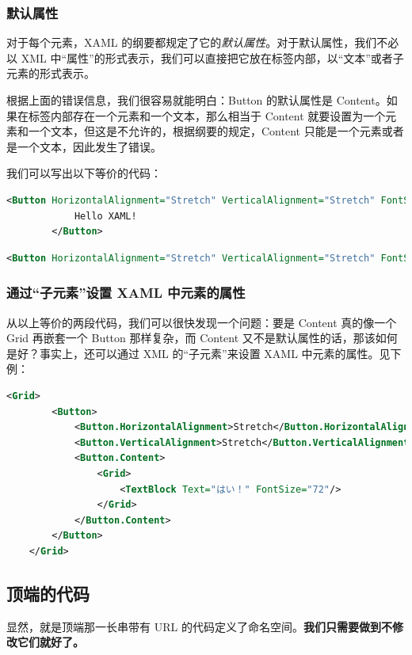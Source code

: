 \subsubsection{默认属性}

对于每个元素，XAML 的纲要都规定了它的\emph{默认属性}。对于默认属性，我们不必以 XML 中``属性''的形式表示，我们可以直接把它放在标签内部，以``文本''或者子元素的形式表示。

根据上面的错误信息，我们很容易就能明白：Button 的默认属性是 Content。如果在标签内部存在一个元素和一个文本，那么相当于 Content 就要设置为一个元素和一个文本，但这是不允许的，根据纲要的规定，Content 只能是一个元素或者是一个文本，因此发生了错误。

我们可以写出以下等价的代码：
\begin{lstlisting}[language = xml]
        <Button HorizontalAlignment="Stretch" VerticalAlignment="Stretch" FontSize="72">
            Hello XAML!
        </Button>
\end{lstlisting}
\begin{lstlisting}[language = xml]
        <Button HorizontalAlignment="Stretch" VerticalAlignment="Stretch" FontSize="72" Content="Hello XAML!"/>
\end{lstlisting}

\subsubsection{通过``子元素''设置 XAML 中元素的属性}

从以上等价的两段代码，我们可以很快发现一个问题：要是 Content 真的像一个 Grid 再嵌套一个 Button 那样复杂，而 Content 又不是默认属性的话，那该如何是好？事实上，还可以通过 XML 的``子元素''来设置 XAML 中元素的属性。见下例：
\begin{lstlisting}[language = xml]
    <Grid>
        <Button>
            <Button.HorizontalAlignment>Stretch</Button.HorizontalAlignment>
            <Button.VerticalAlignment>Stretch</Button.VerticalAlignment>
            <Button.Content>
                <Grid>
                    <TextBlock Text="はい！" FontSize="72"/>
                </Grid>
            </Button.Content>
        </Button>
    </Grid>
\end{lstlisting}

\subsection{顶端的代码}

显然，就是顶端那一长串带有 URL 的代码定义了命名空间。\textbf{我们只需要做到不修改它们就好了。}